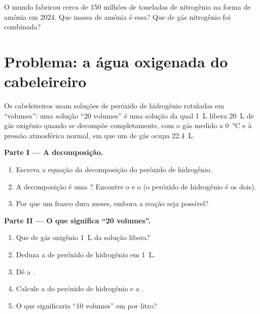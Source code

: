 \begin{exercise}[$\star\star\star$]\label{exo:g12:catalysis:15}
O mundo fabricou cerca de 150 milhões de toneladas de nitrogênio na
forma de amônia em 2024. Que massa de amônia é essa? Que  de gás nitrogênio foi combinada?
\end{exercise}

\section{Problema: a água oxigenada do cabeleireiro}

\begin{problem}
\label{pb:g12:catalysis:1}
Os cabeleireiros usam soluções de peróxido de hidrogênio rotuladas em
``volumes'': uma solução ``20 volumes'' é uma solução da qual \qty{1}{L}
libera \qty{20}{L} de gás oxigênio quando se decompõe completamente, com
o gás medido a \qty{0}{\celsius} e à pressão atmosférica normal, em que
um  de gás ocupa \qty{22.4}{L}.

\medskip
\noindent\textbf{Parte I --- A decomposição.}
\begin{enumerate}
  \item Escreva a equação da decomposição do peróxido de hidrogênio.
  \item A decomposição é uma ? Encontre o 
        e o  (o peróxido de hidrogênio é os dois).
  \item Por que um frasco dura meses, embora a reação seja possível?
\end{enumerate}

\medskip
\noindent\textbf{Parte II --- O que significa ``20 volumes''.}
\begin{enumerate}[resume]
  \item Que  de gás oxigênio \qty{1}{L} da solução
        libera?
  \item Deduza a  de peróxido de hidrogênio em
        \qty{1}{L}.
  \item Dê a .
  \item Calcule a  do peróxido de hidrogênio e a .
  \item O que significaria ``10 volumes'' em  por litro?
\end{enumerate}


\end{problem}
